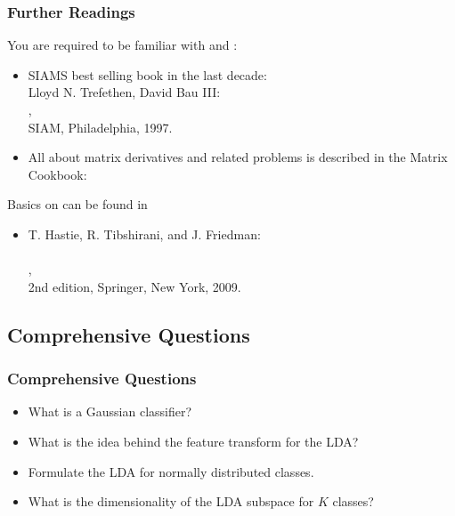 \begin{frame}
  \frametitle{Further Readings}
 
  You are required to be familiar with  and :

  \begin{itemize}
    \item SIAMS best selling book in the last decade:\\[.15cm]
      Lloyd N. Trefethen, David Bau III: \\
      , \\
      SIAM, Philadelphia, 1997. \\[0.15cm]
    \item All about matrix derivatives and related problems is described in the Matrix Cookbook:
       \\[.3cm]
  \end{itemize}

  Basics on  can be found in

  \begin{itemize}
    \item T. Hastie, R. Tibshirani, and J. Friedman: \\
      \\
      ,\\
      2nd edition, Springer, New York, 2009.
   \end{itemize}
\end{frame}


\subsection{Comprehensive Questions}

\begin{frame}
  \frametitle{Comprehensive Questions}

  \begin{itemize}
    \item What is a Gaussian classifier? \\[1cm]
    \item What is the idea behind the feature transform for the LDA? \\[1cm]
    \item Formulate the LDA for normally distributed classes. \\[1cm]
    \item What is the dimensionality of the LDA subspace for $K$ classes?
  \end{itemize}
\end{frame}
